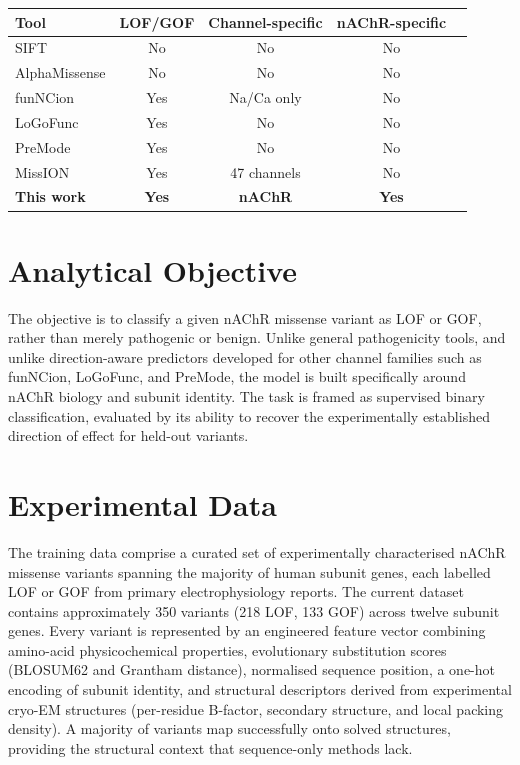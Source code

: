 \documentclass{ws-procs11x85}
\begin{document}
\begin{table}[ht]
{\begin{tabular}{@{}lcccc@{}}
\toprule
Tool & LOF/GOF & Channel-specific & nAChR-specific \\
\midrule
SIFT                  & No  & No          & No  \\
AlphaMissense         & No  & No          & No  \\
funNCion              & Yes & Na/Ca only  & No  \\
LoGoFunc              & Yes & No          & No  \\
PreMode               & Yes & No          & No  \\
MissION               & Yes & 47 channels & No  \\
\textbf{This work}    & \textbf{Yes} & \textbf{nAChR} & \textbf{Yes} \\
\bottomrule
\end{tabular}}
\label{tab:tools}
\end{table}

\section{Analytical Objective}\label{sec:objective}
The objective is to classify a given nAChR missense variant as LOF or
GOF, rather than merely pathogenic or benign. Unlike general pathogenicity
tools, and unlike direction-aware predictors developed for other channel
families such as funNCion, LoGoFunc, and
PreMode, the model is built specifically around nAChR
biology and subunit identity. The task is framed as supervised binary
classification, evaluated by its ability to recover the experimentally
established direction of effect for held-out variants.

\section{Experimental Data}\label{sec:data}
The training data comprise a curated set of experimentally characterised
nAChR missense variants spanning the majority of human subunit genes,
each labelled LOF or GOF from primary electrophysiology
reports. The current dataset contains approximately 350 variants
(218 LOF, 133 GOF) across twelve subunit genes. Every variant is
represented by an engineered feature vector combining amino-acid
physicochemical properties, evolutionary substitution scores (BLOSUM62
and Grantham distance), normalised sequence position, a one-hot encoding
of subunit identity, and structural descriptors derived from experimental
cryo-EM structures (per-residue B-factor, secondary structure, and local
packing density). A majority of variants map successfully onto solved
structures, providing the structural context that sequence-only methods
lack.
\end{document}
